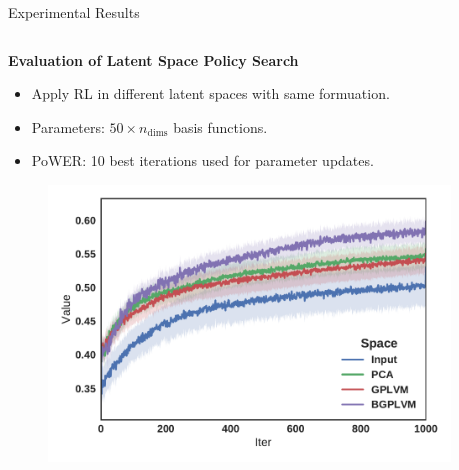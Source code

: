 \documentclass[final,hyperref={pdfpagelabels=false}]{beamer}
\begin{document}
\begin{frame}[t]
\begin{columns}[t]
\begin{column}{0.96\linewidth}
\begin{alertblock}{Experimental Results}
\begin{columns}[t]
                    \begin{column}{0.33\textwidth}
                        \centering \textbf{Evaluation of Latent Space Policy Search}

                        \begin{itemize}
                            \item Apply RL in different latent spaces with same formuation. \vspace*{0.5cm}
                            \item Parameters: $50 \times n_{\text{dims}}$ basis functions. \vspace*{0.5cm}
                            \item PoWER: 10 best iterations used for parameter updates.
                        \end{itemize}
                        \vspace*{1cm}
                        \begin{figure}
                            \centering
                            \includegraphics[width=\textwidth]{rlCurves}
                        \end{figure}
                    \end{column}
                \end{columns}
            \end{alertblock}
        \end{column}

        \begin{column}{0.02\textwidth}\end{column}
    \end{columns}


\end{frame}
\end{document}

